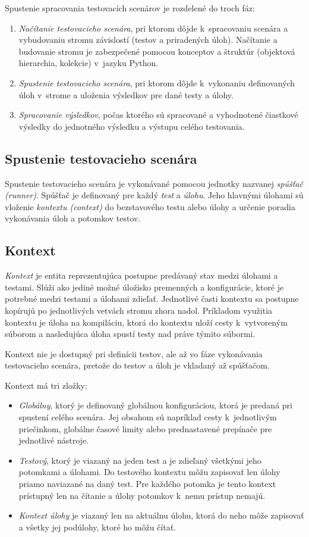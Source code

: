 \documentclass[
  digital, %
  oneside, %
  table,   %
  lof,     %
  lot,   %
]{fithesis3}
\begin{document}
Spustenie spracovania testovacích scenárov je rozdelené do troch fáz:
\begin{enumerate}
    \item \emph{Načítanie testovacieho scenára}, pri ktorom dôjde k~spracovaniu scenára a vybudovaniu stromu závislostí (testov a priradených úloh). Načítanie a budovanie stromu je zabezpečené pomocou konceptov a štruktúr (objektová hierarchia, kolekcie) v~jazyku Python.
    \item \emph{Spustenie testovacieho scenára}, pri ktorom dôjde k~vykonaniu definovaných úloh v~strome a uloženia výsledkov pre dané testy a úlohy.
    \item \emph{Spracovanie výsledkov}, počas ktorého sú spracované a vyhodnotené čiastkové výsledky do jednotného výsledku a výstupu celého testovania.
\end{enumerate}

\subsection{Spustenie testovacieho scenára}

Spustenie testovacieho scenára je vykonávané pomocou jednotky nazvanej \emph{spúšťač (runner)}. Spúšťač je definovaný pre každý \emph{test} a \emph{úlohu}. Jeho hlavnými úlohami sú vloženie \emph{kontextu (context)} do bezstavového testu alebo úlohy a určenie poradia vykonávania úloh a potomkov testov. 

\subsection{Kontext}

\emph{Kontext} je entita reprezentujúca postupne predávaný stav medzi úlohami a testami. Slúži ako jediné možné úložisko premenných a konfigurácie, ktoré je potrebné medzi testami a úlohami zdieľať. Jednotlivé časti kontextu sa postupne kopírujú po jednotlivých vetvách stromu zhora nadol. Príkladom využitia kontextu je úloha na kompiláciu, ktorá do kontextu uloží cesty k~vytvoreným súborom a nasledujúca úloha spustí testy nad práve týmito súbormi.

Kontext nie je dostupný pri definícii testov, ale až vo fáze vykonávania testovacieho scenára, pretože do testov a úloh je vkladaný až spúšťačom.

Kontext má tri zložky:
\begin{itemize}
    \item \emph{Globálny}, ktorý je definovaný globálnou konfiguráciou, ktorá je predaná pri spustení celého scenára. Jej obsahom sú napríklad cesty k~jednotlivým priečinkom, globálne časové limity alebo prednastavené prepínače pre jednotlivé nástroje. 
    \item \emph{Testový}, ktorý je viazaný na jeden test a je zdieľaný všetkými jeho potomkami a úlohami. Do testového kontextu môžu zapisovať len úlohy priamo naviazané na daný test. Pre každého potomka je tento kontext prístupný len na čítanie a úlohy potomkov k~nemu prístup nemajú.
    \item \emph{Kontext úlohy} je viazaný len na aktuálnu úlohu, ktorá do neho môže zapisovať a všetky jej podúlohy, ktoré ho môžu čítať.
\end{itemize}
\end{document}
